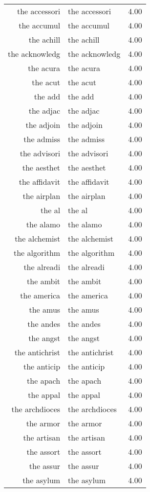\begin{table}[ht]
\begin{tabular}{rlr}
  the accessori & the accessori & 4.00 \\ 
  the accumul & the accumul & 4.00 \\ 
  the achill & the achill & 4.00 \\ 
  the acknowledg & the acknowledg & 4.00 \\ 
  the acura & the acura & 4.00 \\ 
  the acut & the acut & 4.00 \\ 
  the add & the add & 4.00 \\ 
  the adjac & the adjac & 4.00 \\ 
  the adjoin & the adjoin & 4.00 \\ 
  the admiss & the admiss & 4.00 \\ 
  the advisori & the advisori & 4.00 \\ 
  the aesthet & the aesthet & 4.00 \\ 
  the affidavit & the affidavit & 4.00 \\ 
  the airplan & the airplan & 4.00 \\ 
  the al & the al & 4.00 \\ 
  the alamo & the alamo & 4.00 \\ 
  the alchemist & the alchemist & 4.00 \\ 
  the algorithm & the algorithm & 4.00 \\ 
  the alreadi & the alreadi & 4.00 \\ 
  the ambit & the ambit & 4.00 \\ 
  the america & the america & 4.00 \\ 
  the amus & the amus & 4.00 \\ 
  the andes & the andes & 4.00 \\ 
  the angst & the angst & 4.00 \\ 
  the antichrist & the antichrist & 4.00 \\ 
  the anticip & the anticip & 4.00 \\ 
  the apach & the apach & 4.00 \\ 
  the appal & the appal & 4.00 \\ 
  the archdioces & the archdioces & 4.00 \\ 
  the armor & the armor & 4.00 \\ 
  the artisan & the artisan & 4.00 \\ 
  the assort & the assort & 4.00 \\ 
  the assur & the assur & 4.00 \\ 
  the asylum & the asylum & 4.00 \\ 

\end{tabular}
\end{table}
